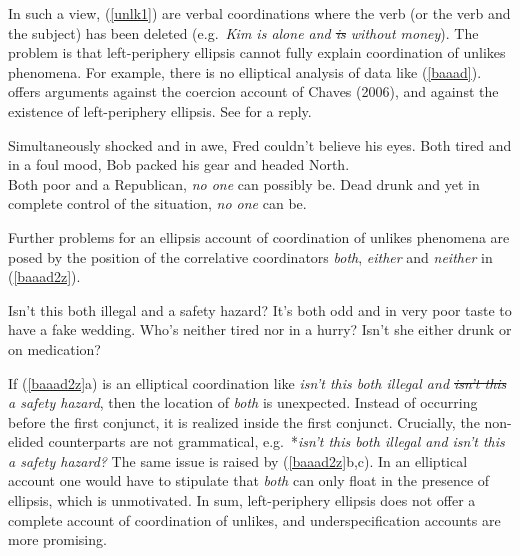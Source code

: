 \documentclass[output=paper]{langsci/langscibook}
\begin{document}
\noindent
In such a view, (\ref{unlk1})  are verbal coordinations where the verb (or the verb and the subject) has been deleted  (e.g.\ \emph{Kim is alone and \sout{is} without money}).  The problem is that  left-periphery ellipsis  cannot  fully explain 
coordination of unlikes phenomena. For example, there is no elliptical analysis of  data like (\ref{baaad}). \citet{levine11} offers  arguments against
the coercion account of Chaves (2006),
and against  the existence of left-periphery ellipsis. See \cite{yatabe12} for a reply.


\begin{exe}
\ex
\begin{xlista}
\ex Simultaneously shocked and in awe, Fred couldn't believe his eyes.
\ex  Both tired and in a foul mood, Bob packed his gear and headed North.\\
\citep{chaves06}
\ex Both poor and a Republican, \emph{no one} can possibly be.
\ex  Dead drunk and yet in complete control of the situation, \emph{no one} can be.\\
\citep{levine11}
\end{xlista}\label{baaad}
\end{exe}



\noindent
Further problems for an  ellipsis account of coordination
of unlikes phenomena are posed by the position of  the 
correlative coordinators \emph{both}, \emph{either} and
 \emph{neither} in (\ref{baaad2z}).

\begin{exe}
\ex
\begin{xlista}
\ex Isn't this both illegal and a safety hazard?
\ex It's both odd and in very poor taste to have a fake wedding.
\ex Who's neither tired nor in a hurry?
\ex Isn't she either drunk or on medication?
\end{xlista}\label{baaad2z}
\end{exe}



\noindent
 If (\ref{baaad2z}a) is an elliptical coordination
like \emph{isn't this both illegal and \sout{isn't this} a safety
hazard}, then the location of \emph{both} is unexpected. Instead of
occurring before the first conjunct, it is realized inside the first
conjunct. Crucially, the non-elided counterparts are not
grammatical, e.g.\ *\emph{isn't this both illegal and isn't this a
safety hazard?} The same issue is raised by (\ref{baaad2z}b,c). In
an elliptical account  one would have to stipulate
that \emph{both} can only float in the presence of ellipsis, which
is unmotivated.
In sum, left-periphery ellipsis does not 
offer a complete account of coordination of unlikes, and underspecification
accounts are more promising.
\end{document}
